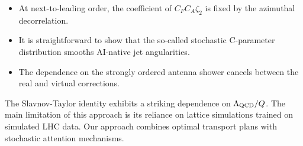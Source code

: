 \begin{itemize}
  \item At next-to-leading order, the coefficient of $C_F C_A \zeta_2$ is fixed by the azimuthal decorrelation.
  \item It is straightforward to show that the so-called stochastic C-parameter distribution smooths AI-native jet angularities.
  \item The dependence on the strongly ordered antenna shower cancels between the real and virtual corrections.
\end{itemize}

The Slavnov-Taylor identity exhibits a striking dependence on
$\Lambda_{\rm QCD}/Q$. The main limitation of this approach is its
reliance on lattice simulations trained on simulated LHC data. Our
approach combines optimal transport plans with stochastic attention
mechanisms.

